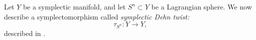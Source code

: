 
Let $Y$ be a symplectic manifold, and let $S^{n}\subset Y$ be a Lagrangian sphere. 
We now describe a symplectomorphism called \emph{symplectic Dehn twist:}
\[\tau_{S^n}: Y\to Y,\]
described in \cite{seidel2003long}. 




